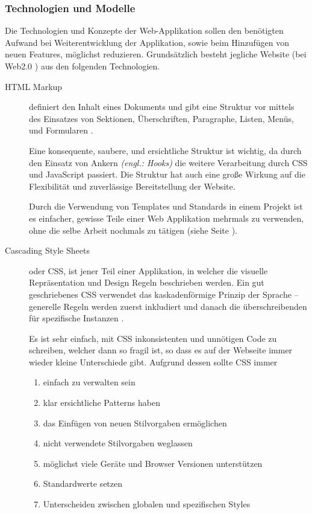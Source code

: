 \subsubsection{Technologien und Modelle}

Die Technologien und Konzepte der Web-Applikation sollen den benötigten Aufwand bei Weiterentwicklung der Applikation, sowie beim Hinzufügen von neuen Features, möglichst reduzieren. Grundsätzlich besteht jegliche Website (bei Web2.0 \cite{MELD.CH3-web-app.web2}) aus den folgenden Technologien.

\begin{description}
\item[HTML Markup \newline] definiert den Inhalt eines Dokuments und gibt eine Struktur vor mittels des Einsatzes von Sektionen, Überschriften, Paragraphe, Listen, Menüs, und Formularen \cite{MELD.CH3-web-app.html}.

Eine konsequente, saubere, und ersichtliche Struktur ist wichtig, da durch den Einsatz von Ankern \textit{(engl.: Hooks)} die weitere Verarbeitung durch CSS und JavaScript passiert. Die Struktur hat auch eine große Wirkung auf die Flexibilität und zuverlässige Bereitstellung der Website.

Durch die Verwendung von Templates und Standards in einem Projekt ist es einfacher, gewisse Teile einer Web Applikation mehrmals zu verwenden, ohne die selbe Arbeit nochmals zu tätigen (siehe Seite \pageref{subsec:jsframeworks}).

\item[Cascading Style Sheets\newline] oder CSS, ist jener Teil einer Applikation, in welcher die visuelle Repräsentation und Design Regeln beschrieben werden. Ein gut geschriebenes CSS verwendet das kaskadenförmige Prinzip der Sprache – generelle Regeln werden zuerst inkludiert und danach die überschreibenden für spezifische Instanzen \cite{MELD.CH3-web-app.css}.

Es ist sehr einfach, mit CSS inkonsistenten und unnötigen Code zu schreiben, welcher dann so fragil ist, so dass es auf der Webseite immer wieder kleine Unterschiede gibt. Aufgrund dessen sollte CSS immer \cite{MELD.CH3-web-app.css2}
\begin{enumerate}
\item einfach zu verwalten sein
\item klar ersichtliche Patterns haben
\item das Einfügen von neuen Stilvorgaben ermöglichen
\item nicht verwendete Stilvorgaben weglassen
\item möglichst viele Geräte und Browser Versionen unterstützen
\item Standardwerte setzen
\item Unterscheiden zwischen globalen und spezifischen Styles
\end{enumerate}


\end{description}
